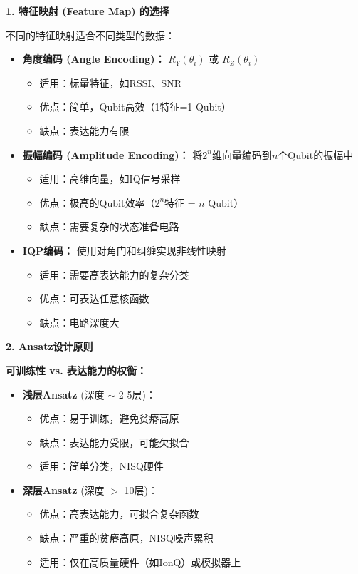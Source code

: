\documentclass[11pt,a4paper]{article}
\begin{document}
\textbf{1. 特征映射 (Feature Map) 的选择}

不同的特征映射适合不同类型的数据：

\begin{itemize}
\item \textbf{角度编码 (Angle Encoding)：} $R_Y(\theta_i)$ 或 $R_Z(\theta_i)$
\begin{itemize}
\item 适用：标量特征，如RSSI、SNR
\item 优点：简单，Qubit高效（1特征=1 Qubit）
\item 缺点：表达能力有限
\end{itemize}

\item \textbf{振幅编码 (Amplitude Encoding)：} 将$2^n$维向量编码到$n$个Qubit的振幅中
\begin{itemize}
\item 适用：高维向量，如IQ信号采样
\item 优点：极高的Qubit效率（$2^n$特征 = $n$ Qubit）
\item 缺点：需要复杂的状态准备电路
\end{itemize}

\item \textbf{IQP编码：} 使用对角门和纠缠实现非线性映射
\begin{itemize}
\item 适用：需要高表达能力的复杂分类
\item 优点：可表达任意核函数
\item 缺点：电路深度大
\end{itemize}
\end{itemize}

\textbf{2. Ansatz设计原则}

\textbf{可训练性 vs. 表达能力的权衡：}

\begin{itemize}
\item \textbf{浅层Ansatz} (深度 $\sim$ 2-5层)：
\begin{itemize}
\item 优点：易于训练，避免贫瘠高原
\item 缺点：表达能力受限，可能欠拟合
\item 适用：简单分类，NISQ硬件
\end{itemize}

\item \textbf{深层Ansatz} (深度 $>$ 10层)：
\begin{itemize}
\item 优点：高表达能力，可拟合复杂函数
\item 缺点：严重的贫瘠高原，NISQ噪声累积
\item 适用：仅在高质量硬件（如IonQ）或模拟器上
\end{itemize}
\end{itemize}
\end{document}
